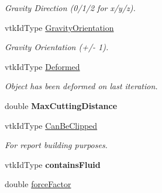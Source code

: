 \begin{DoxyCompactItemize}
\begin{DoxyCompactList}\small\item\em Gravity Direction (0/1/2 for x/y/z). \item\end{DoxyCompactList}\item 
\hypertarget{classvtkOrgan_ad72018cd59849fb9b69b878c4e4e789f}{
vtkIdType \hyperlink{classvtkOrgan_ad72018cd59849fb9b69b878c4e4e789f}{GravityOrientation}}
\label{classvtkOrgan_ad72018cd59849fb9b69b878c4e4e789f}

\begin{DoxyCompactList}\small\item\em Gravity Orientation (+/-\/ 1). \item\end{DoxyCompactList}\item 
\hypertarget{classvtkOrgan_ab295d13a4a6990c99e7b7aeea05d23bb}{
vtkIdType \hyperlink{classvtkOrgan_ab295d13a4a6990c99e7b7aeea05d23bb}{Deformed}}
\label{classvtkOrgan_ab295d13a4a6990c99e7b7aeea05d23bb}

\begin{DoxyCompactList}\small\item\em Object has been deformed on last iteration. \item\end{DoxyCompactList}\item 
\hypertarget{classvtkOrgan_aa3b8dec2ab2e8d174536fc7b00bac54e}{
double {\bfseries MaxCuttingDistance}}
\label{classvtkOrgan_aa3b8dec2ab2e8d174536fc7b00bac54e}

\item 
\hypertarget{classvtkOrgan_a47d5571408412f4f052bba6498459ada}{
vtkIdType \hyperlink{classvtkOrgan_a47d5571408412f4f052bba6498459ada}{CanBeClipped}}
\label{classvtkOrgan_a47d5571408412f4f052bba6498459ada}

\begin{DoxyCompactList}\small\item\em For report building purposes. \item\end{DoxyCompactList}\item 
\hypertarget{classvtkOrgan_af732308f2301688c6e53115617877791}{
vtkIdType {\bfseries containsFluid}}
\label{classvtkOrgan_af732308f2301688c6e53115617877791}

\item 
\hypertarget{classvtkOrgan_aaf8bc8fd017dac3d930afa3caab7052a}{
double \hyperlink{classvtkOrgan_aaf8bc8fd017dac3d930afa3caab7052a}{forceFactor}}
\label{classvtkOrgan_aaf8bc8fd017dac3d930afa3caab7052a}


\end{DoxyCompactItemize}
